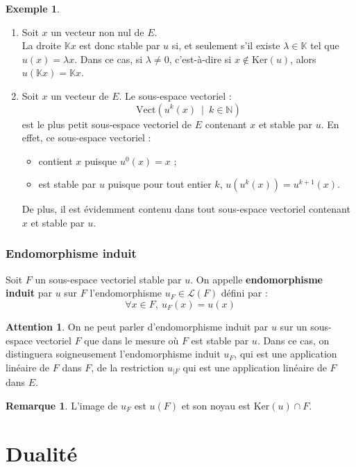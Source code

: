 \documentclass[french]{article}
\newcommand{\N}{\mathbb{N}}
\newcommand{\K}{\mathbb{K}}
\renewcommand{\ker}{\text{Ker}}
\newcommand{\Vect}{\text{Vect}}
\theoremstyle{plain}
\theoremstyle{definition}
\newtheorem*{ex}{Exemple}
\newtheorem*{rmq}{Remarque}
\newtheorem*{attention}{Attention}
\theoremstyle{remark}
\begin{document}
\begin{ex}
	\begin{enumerate}
		\item Soit $x$ un vecteur non nul de $E$. \\
		La droite $\K x$ est donc stable par $u$ si, et seulement s'il existe $\lambda\in \K$ tel que $u(x)=\lambda x$. Dans ce cas, si $\lambda\ne 0$, c'est-à-dire si $x\notin\ker(u)$, alors $u(\K x)=\K x$.
		\item Soit $x$ un vecteur de $E$. Le sous-espace vectoriel : $$\Vect\left(u^k(x)\ \mid\ k\in\N\right)$$ est le plus petit sous-espace vectoriel de $E$ contenant $x$ et stable par $u$. En effet, ce sous-espace vectoriel :
		\begin{itemize}
			\item contient $x$ puisque $u^0(x)=x$ ;
			\item est stable par $u$ puisque pour tout entier $k$, $u(u^k(x))=u^{k+1}(x)$.
		\end{itemize}
		De plus, il est évidemment contenu dans tout sous-espace vectoriel contenant $x$ et stable par $u$.
	\end{enumerate}
\end{ex}

\subsubsection*{Endomorphisme induit}

\begin{dfn}
	Soit $F$ un sous-espace vectoriel stable par $u$. On appelle \textbf{endomorphisme induit} par $u$ sur $F$ l'endomorphisme $u_F\in\mathcal{L}(F)$ défini par : $$\forall x\in F,\ u_F(x)=u(x)$$
\end{dfn}

\begin{attention}
	On ne peut parler d'endomorphisme induit par $u$ sur un sous-espace vectoriel $F$ que dans le mesure où $F$ est stable par $u$. Dans ce cas, on distinguera soigneusement l'endomorphisme induit $u_F$, qui est une application linéaire de $F$ dans $F$, de la restriction $u_{\mid F}$ qui est une application linéaire de $F$ dans $E$.
\end{attention}

\begin{rmq}
	L'image de $u_F$ est $u(F)$ et son noyau est $\ker(u)\cap F$.
\end{rmq}

\section{Dualité}
\end{document}
